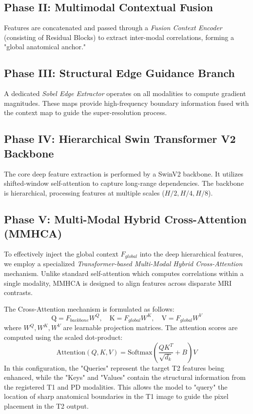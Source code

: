 \subsection{Phase II: Multimodal Contextual Fusion}
Features are concatenated and passed through a \textit{Fusion Context Encoder} (consisting of Residual Blocks) to extract inter-modal correlations, forming a "global anatomical anchor."

\subsection{Phase III: Structural Edge Guidance Branch}
A dedicated \textit{Sobel Edge Extractor} operates on all modalities to compute gradient magnitudes. These maps provide high-frequency boundary information fused with the context map to guide the super-resolution process.

\subsection{Phase IV: Hierarchical Swin Transformer V2 Backbone}
The core deep feature extraction is performed by a SwinV2 backbone. It utilizes shifted-window self-attention to capture long-range dependencies. The backbone is hierarchical, processing features at multiple scales ($H/2, H/4, H/8$).

\subsection{Phase V: Multi-Modal Hybrid Cross-Attention (MMHCA)}
To effectively inject the global context $F_{global}$ into the deep hierarchical features, we employ a specialized \textit{Transformer-based Multi-Modal Hybrid Cross-Attention} mechanism. Unlike standard self-attention which computes correlations within a single modality, MMHCA is designed to align features across disparate MRI contrasts.

The Cross-Attention mechanism is formulated as follows:
\begin{equation}
    \text{Q} = F_{backbone} W^Q, \quad \text{K} = F_{global} W^K, \quad \text{V} = F_{global} W^V
\end{equation}
where $W^Q, W^K, W^V$ are learnable projection matrices. The attention scores are computed using the scaled dot-product:
\begin{equation}
    \text{Attention}(Q, K, V) = \text{Softmax}\left(\frac{QK^T}{\sqrt{d_k}} + B\right)V
\end{equation}
In this configuration, the "Queries" represent the target T2 features being enhanced, while the "Keys" and "Values" contain the structural information from the registered T1 and PD modalities. This allows the model to "query" the location of sharp anatomical boundaries in the T1 image to guide the pixel placement in the T2 output. 

